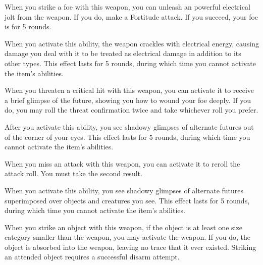 
 When you strike a foe with this weapon, you can unleash an powerful electrical jolt from the weapon.
If you do, make a Fortitude attack.
If you succeed, your foe is \staggered for 5 rounds.

When you activate this ability, the weapon crackles with electrical energy, causing damage you deal with it to be treated as electrical damage in addition to its other types.
This effect lasts for 5 rounds, during which time you cannot activate the item's abilities.


 When you threaten a critical hit with this weapon, you can activate it to receive a brief glimpse of the future, showing you how to wound your foe deeply.
If you do, you may roll the threat confirmation twice and take whichever roll you prefer.

After you activate this ability, you see shadowy glimpses of alternate futures out of the corner of your eyes.
This effect lasts for 5 rounds, during which time you cannot activate the item's abilities.


 When you miss an attack with this weapon, you can activate it to reroll the attack roll.
You must take the second result.

When you activate this ability, you see shadowy glimpses of alternate futures superimposed over objects and creatures you see.
This effect lasts for 5 rounds, during which time you cannot activate the item's abilities.


 When you strike an object with this weapon, if the object is at least one size category smaller than the weapon, you may activate the weapon.
If you do, the object is absorbed into the weapon, leaving no trace that it ever existed.
Striking an attended object requires a successful disarm attempt.

